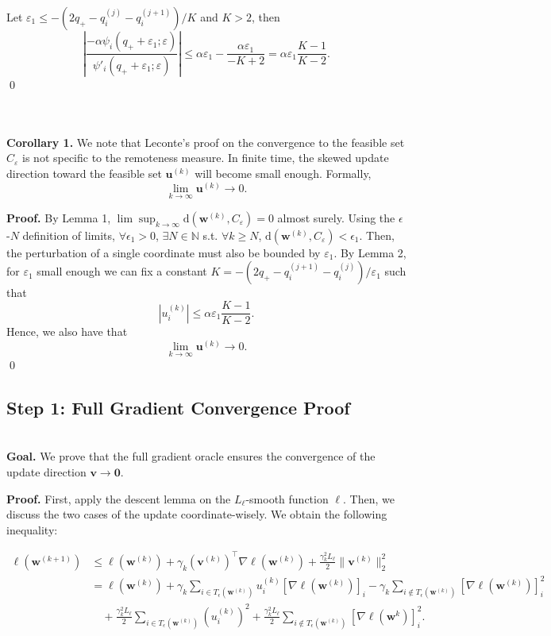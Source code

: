 \documentclass[10pt,a4paper]{article}
\begin{document}
Let $\varepsilon_1\leq -(2q_+-q_i^{(j)}-q_i^{(j+1)})/K$ and $K>2$, then $$\left\lvert \frac{-\alpha\psi_i(q_++\varepsilon_1;\varepsilon)}{\psi'_i(q_++\varepsilon_1;\varepsilon)}\right\rvert\leq \alpha\varepsilon_1-\frac{\alpha\varepsilon_1}{-K+2}=\alpha\varepsilon_1\frac{K-1}{K-2}.$$\qed

\phantom{}\\\phantom{}\\

\textbf{Corollary 1.} We note that Leconte's proof on the convergence to the feasible set $C_\varepsilon$ is not specific to the remoteness measure. In finite time, the skewed update direction toward the feasible set $\mathbf{u}^{(k)}$ will become small enough. Formally, \[\lim_{k\to\infty} \mathbf{u}^{(k)}\to 0.\]

\textbf{Proof.} By Lemma 1, $\lim\sup_{k\to\infty} \text{d}(\mathbf{w}^{(k)}, C_\varepsilon)=0$ almost surely. Using the $\epsilon$-$N$ definition of limits, $\forall \epsilon_1>0$, $\exists N\in\mathbb{N}$ s.t. $\forall k\geq N$, $\text{d}(\mathbf{w}^{(k)}, C_\varepsilon)<\epsilon_1$. Then, the perturbation of a single coordinate must also be bounded by $\varepsilon_1$. By Lemma 2, for $\varepsilon_1$ small enough we can fix a constant $K=-(2q_+-q_i^{(j+1)}-q_i^{(j)})/\varepsilon_1$ such that $$\left\lvert u^{(k)}_i \right\rvert\leq \alpha\varepsilon_1\frac{K-1}{K-2}.$$ Hence, we also have that \[\lim_{k\to\infty} \mathbf{u}^{(k)}\to 0.\]\qed
\newpage
\subsection{Step 1: Full Gradient Convergence Proof}\hfill\\

\textbf{Goal.} We prove that the full gradient oracle ensures the convergence of the update direction $\mathbf{v}\to \mathbf{0}$.

\textbf{Proof.} First, apply the descent lemma on the $L_\ell$-smooth function $\ell$. Then, we discuss the two cases of the update coordinate-wisely. We obtain the following inequality:

\begin{align*}\ell(\mathbf{w}^{(k+1)}) & \leq \ell(\mathbf{w}^{(k)})+\gamma_k (\mathbf{v}^{(k)})^\top \nabla \ell(\mathbf{w}^{(k)})+\frac{\gamma_k^2 L_\ell}{2}\lVert \mathbf{v}^{(k)}\rVert_2^2                                                                      \\
                                       & =\ell(\mathbf{w}^{(k)})+\gamma_k \sum\limits_{i\in T_\epsilon(\mathbf{w}^{(k)})} u_i^{(k)} [\nabla \ell(\mathbf{w}^{(k)})]_i-\gamma_k \sum\limits_{i\notin T_\epsilon(\mathbf{w}^{(k)})} [\nabla \ell(\mathbf{w}^{(k)})]_i^2 \\
                                       & \quad +\frac{\gamma_k^2 L_\ell}{2}\sum\limits_{i\in T_\epsilon(\mathbf{w}^{(k)})} (u_i^{(k)})^2+\frac{\gamma_k^2 L_\ell}{2}\sum\limits_{i\notin T_\epsilon(\mathbf{w}^{(k)})} [\nabla \ell(\mathbf{w}^{k})]_i^2.
\end{align*}
\end{document}
